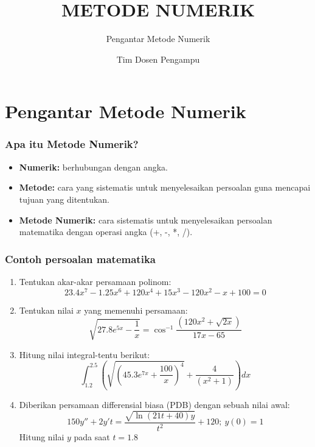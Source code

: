 \documentclass[pdflatex,compress]{beamer}
\title{METODE NUMERIK}
\subtitle{Pengantar Metode Numerik}
\author{Tim Dosen Pengampu}
\begin{document}
\maketitle

\section{Pengantar Metode Numerik}

\begin{frame}
\frametitle{Apa itu Metode Numerik?}
	\begin{itemize}
		\item \textbf{Numerik:} berhubungan dengan angka.
		\item \textbf{Metode:} cara yang sistematis untuk menyelesaikan persoalan guna mencapai tujuan yang ditentukan.
		\item \textbf{Metode Numerik:} cara sistematis untuk menyelesaikan persoalan matematika dengan operasi angka (+, -, *, /).
	\end{itemize}
\end{frame}

\begin{frame}
\frametitle{Contoh persoalan matematika}
	\begin{enumerate}
		\item Tentukan akar-akar persamaan polinom:
		\[ 23.4x^7 - 1.25x^6 + 120x^4 + 15x^3 - 120x^2- x + 100 = 0 \]
		 \item Tentukan nilai $ x $ yang memenuhi persamaan:
		 \[ \sqrt{27.8e^{5x} - \frac{1}{x}} = \cos^{-1}\frac{(120x^2 + \sqrt{2x})}{17x-65}\]
		 \item Hitung nilai integral-tentu berikut:
		 \[ \int_{1.2}^{2.5} \left( \sqrt{\left(45.3e^{7x}+\frac{100}{x}\right)^4} + \frac{4}{(x^2 + 1)} \right) dx \]
	\end{enumerate}
\end{frame}

\begin{frame}
	\begin{enumerate}
		\setcounter{enumi}{3}
		\item Diberikan persamaan differensial biasa (PDB) dengan sebuah nilai awal:
		\[ 150y'' + 2y't = \frac{\sqrt{\ln(21t+40)y}}{t^2} + 120;~y(0)=1 \]
		Hitung nilai $ y $ pada saat $ t = 1.8 $
	\end{enumerate}
\end{frame}
\end{document}

